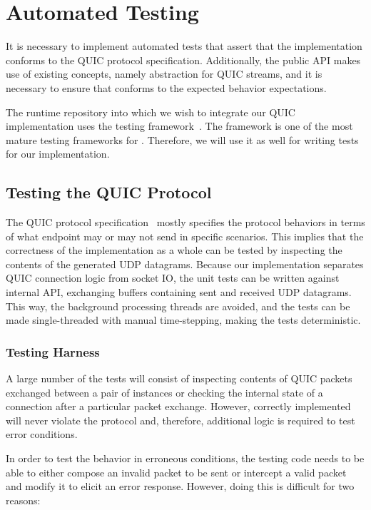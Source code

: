 \section{Automated Testing}

It is necessary to implement automated tests that assert that the implementation conforms to the
QUIC protocol specification. Additionally, the public API makes use of existing concepts, namely
 abstraction for QUIC streams, and it is necessary to ensure that \QuicStream{}
conforms to the expected  behavior expectations.

The \dotnet{} runtime repository into which we wish to integrate our QUIC implementation uses the
\xUnit{} testing framework~\cite{xunit}. The \xUnit{} framework is one of the most mature testing
frameworks for \dotnet{}. Therefore, we will use it as well for writing tests for our
implementation.

\subsection{Testing the QUIC Protocol}

The QUIC protocol specification~\cite{draft-ietf-quic-transport} mostly specifies the protocol
behaviors in terms of what endpoint may or may not send in specific scenarios. This implies that the
correctness of the implementation as a whole can be tested by inspecting the contents of the
generated UDP datagrams. Because our implementation separates QUIC connection logic from socket IO,
the unit tests can be written against internal \QuicConnection{} API, exchanging buffers containing
sent and received UDP datagrams. This way, the background processing threads are avoided, and the
tests can be made single-threaded with manual time-stepping, making the tests deterministic.

\subsubsection{Testing Harness}\label{sec:03-testing-harness}

A large number of the tests will consist of inspecting contents of QUIC packets exchanged between a
pair of \QuicConnection{} instances or checking the internal state of a connection after a
particular packet exchange. However, correctly implemented \QuicConnection{} will never violate the
protocol and, therefore, additional logic is required to test error conditions.

In order to test the behavior in erroneous conditions, the testing code needs to be able to either
compose an invalid packet to be sent or intercept a valid packet and modify it to elicit an error
response. However, doing this is difficult for two reasons:

